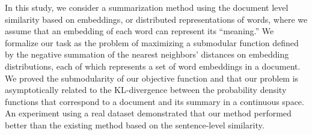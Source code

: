 In this study, we consider a summarization method using the document level similarity based on embeddings, or distributed representations of words, where we assume that an embedding of each word can represent its ``meaning.'' We formalize our task as the problem of maximizing a submodular function defined by the negative summation of the nearest neighbors' distances on embedding distributions, each of which represents a set of word embeddings in a document. We proved the submodularity of our objective function and that our problem is asymptotically related to the KL-divergence between the probability density functions that correspond to a document and its summary in a continuous space. An experiment using a real dataset demonstrated that our method performed better than the existing method based on the sentence-level similarity.
